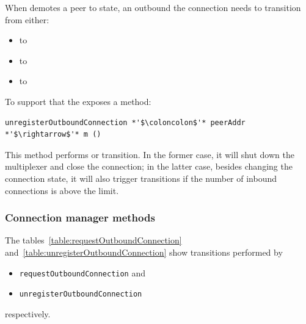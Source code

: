 When \ptopgov{} demotes a peer to \cold{} state, an outbound
the connection needs to transition from either:

\begin{itemize}
  \item \OutboundStateAny{} to \OutboundIdleStateAny{}
  \item \OutboundStateDupTau{} to \InboundIdleStateDup{}
  \item \DuplexState{} to \InboundStateDup{}
\end{itemize}

To support that the \connmngr{} exposes a method:

\begin{lstlisting}
unregisterOutboundConnection *'$\coloncolon$'* peerAddr *'$\rightarrow$'* m ()
\end{lstlisting}
This method performs \DemotedToColdUniLoc{} or
\DemotedToColdDupLoc{} transition. In the former case, it will shut down the
multiplexer and close the \TCP{} connection; in the latter case, besides
changing the connection state, it will also trigger \Prune{} transitions if
the number of inbound connections is above the limit.

\subsubsection{Connection manager methods}

The tables~\ref{table:requestOutboundConnection}
and~\ref{table:unregisterOutboundConnection} show transitions performed by
\begin{itemize}
  \item \texttt{requestOutboundConnection} and
  \item \texttt{unregisterOutboundConnection}
\end{itemize}
respectively.

